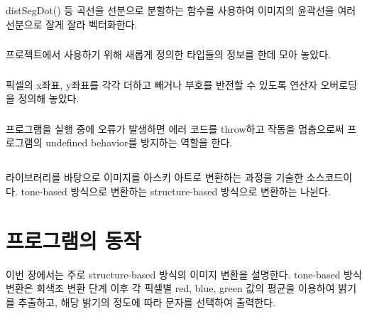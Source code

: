 \documentclass[conference]{IEEEtran}
\begin{document}
 distSegDot() 등 곡선을 선분으로 분할하는 함수를 사용하여 이미지의 윤곽선을 여러 선분으로 잘게 잘라 벡터화한다.

\subsubsection{\egTypes}

 프로젝트에서 사용하기 위해 새롭게 정의한 타입들의 정보를 한데 모아 놓았다.

\subsubsection{\egOperators}

 픽셀의 x좌표, y좌표를 각각 더하고 빼거나 부호를 반전할 수 있도록 연산자 오버로딩을 정의해 놓았다.

\subsubsection{\egExceptions}

 프로그램을 실행 중에 오류가 발생하면 에러 코드를 throw하고 작동을 멈춤으로써 프로그램의 undefined behavior를 방지하는 역할을 한다.

\subsection{\imgascii}

 \eg 라이브러리를 바탕으로 이미지를 아스키 아트로 변환하는 과정을 기술한 소스코드이다.
tone-based 방식으로 변환하는  structure-based 방식으로 변환하는  나뉜다.

\subsubsection{\tone}

\subsubsection{\structure}

\section{프로그램의 동작}

이번 장에서는 주로 structure-based 방식의 이미지 변환을 설명한다.
tone-based 방식 변환은 회색조 변환 단계 이후 각 픽셀별 red, blue, green 값의 평균을 이용하여 밝기를 추출하고, 해당 밝기의 정도에 따라 문자를 선택하여 출력한다.
\end{document}
